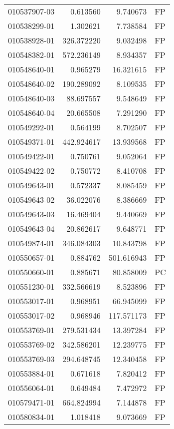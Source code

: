 \begin{tabular}{lrrl}
010537907-03 &    0.613560 &     9.740673 &   FP \\
010538299-01 &    1.302621 &     7.738584 &   FP \\
010538928-01 &  326.372220 &     9.032498 &   FP \\
010548382-01 &  572.236149 &     8.934357 &   FP \\
010548640-01 &    0.965279 &    16.321615 &   FP \\
010548640-02 &  190.289092 &     8.109535 &   FP \\
010548640-03 &   88.697557 &     9.548649 &   FP \\
010548640-04 &   20.665508 &     7.291290 &   FP \\
010549292-01 &    0.564199 &     8.702507 &   FP \\
010549371-01 &  442.924617 &    13.939568 &   FP \\
010549422-01 &    0.750761 &     9.052064 &   FP \\
010549422-02 &    0.750772 &     8.410708 &   FP \\
010549643-01 &    0.572337 &     8.085459 &   FP \\
010549643-02 &   36.022076 &     8.386669 &   FP \\
010549643-03 &   16.469404 &     9.440669 &   FP \\
010549643-04 &   20.862617 &     9.648771 &   FP \\
010549874-01 &  346.084303 &    10.843798 &   FP \\
010550657-01 &    0.884762 &   501.616943 &   FP \\
010550660-01 &    0.885671 &    80.858009 &   PC \\
010551230-01 &  332.566619 &     8.523896 &   FP \\
010553017-01 &    0.968951 &    66.945099 &   FP \\
010553017-02 &    0.968946 &   117.571173 &   FP \\
010553769-01 &  279.531434 &    13.397284 &   FP \\
010553769-02 &  342.586201 &    12.239775 &   FP \\
010553769-03 &  294.648745 &    12.340458 &   FP \\
010553884-01 &    0.671618 &     7.820412 &   FP \\
010556064-01 &    0.649484 &     7.472972 &   FP \\
010579471-01 &  664.824994 &     7.144878 &   FP \\
010580834-01 &    1.018418 &     9.073669 &   FP \\

\end{tabular}
